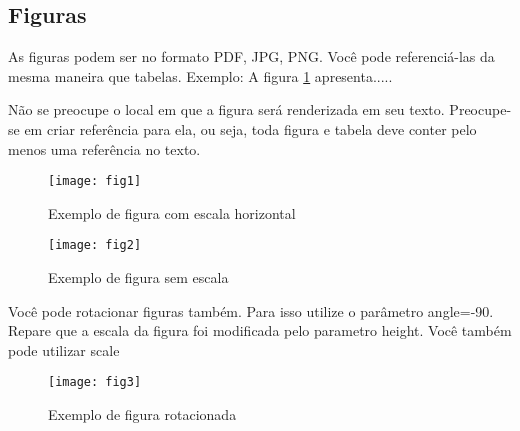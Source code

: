 \documentclass[	DIV=calc,%
							paper=a4,%
							fontsize=12pt,%
							onecolumn]{scrartcl}	 					%
\begin{document}
\subsection{Figuras}

As figuras podem ser no formato PDF, JPG, PNG. Você pode referenciá-las da mesma maneira que tabelas. Exemplo: A figura \ref{fig1} apresenta.....

Não se preocupe o local em que a figura será renderizada em seu texto. Preocupe-se em criar referência para ela, ou seja, toda figura e tabela deve conter pelo menos uma referência no texto.

\begin{figure}
\centering
\texttt{[image: fig1]}
\caption{Exemplo de figura com escala horizontal}
\label{fig1}
\end{figure}


\begin{figure}
	\centering
	\texttt{[image: fig2]}
	\caption{Exemplo de figura sem escala}
	\label{fig2}
\end{figure}

Você pode rotacionar figuras também. Para isso utilize o parâmetro angle=-90. Repare que a escala da figura foi modificada pelo parametro height. Você também pode utilizar scale

\begin{figure}
	\centering
	\texttt{[image: fig3]}
	\caption{Exemplo de figura rotacionada}
	\label{fig3}
\end{figure}


\end{document}
